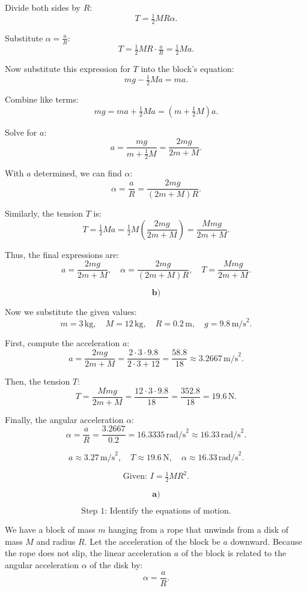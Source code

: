 \documentclass{article}
\begin{document}
Divide both sides by $R$:
\[
T = \tfrac{1}{2} M R \alpha.
\]

Substitute $\alpha = \tfrac{a}{R}$:
\[
T = \tfrac{1}{2} M R \cdot \tfrac{a}{R} = \tfrac{1}{2} M a.
\]

Now substitute this expression for $T$ into the block's equation:
\[
m g - \tfrac{1}{2} M a = m a.
\]

Combine like terms:
\[
m g = m a + \tfrac{1}{2} M a = \left(m + \tfrac{1}{2} M \right) a.
\]

Solve for $a$:
\[
a = \frac{m g}{m + \tfrac{1}{2} M} = \frac{2 m g}{2 m + M}.
\]

With $a$ determined, we can find $\alpha$:
\[
\alpha = \frac{a}{R} = \frac{2 m g}{(2 m + M) R}.
\]

Similarly, the tension $T$ is:
\[
T = \tfrac{1}{2} M a = \tfrac{1}{2} M \left( \frac{2 m g}{2 m + M} \right) = \frac{M m g}{2 m + M}.
\]

Thus, the final expressions are:
\[
a = \frac{2 m g}{2 m + M}, \quad \alpha = \frac{2 m g}{(2 m + M) R}, \quad T = \frac{M m g}{2 m + M}.
\]

\[
\textbf{b)} 
\]

Now we substitute the given values: 
\[
m = 3 \,\text{kg}, \quad M = 12 \,\text{kg}, \quad R = 0.2 \,\text{m}, \quad g = 9.8 \,\text{m/s}^2.
\]

First, compute the acceleration $a$:
\[
a = \frac{2 m g}{2 m + M} = \frac{2 \cdot 3 \cdot 9.8}{2 \cdot 3 + 12} = \frac{58.8}{18} \approx 3.2667 \,\text{m/s}^2.
\]

Then, the tension $T$:
\[
T = \frac{M m g}{2 m + M} = \frac{12 \cdot 3 \cdot 9.8}{18} = \frac{352.8}{18} = 19.6 \,\text{N}.
\]

Finally, the angular acceleration $\alpha$:
\[
\alpha = \frac{a}{R} = \frac{3.2667}{0.2} = 16.3335 \,\text{rad/s}^2 \approx 16.33 \,\text{rad/s}^2.
\]

\[
\boxed{a \approx 3.27 \,\text{m/s}^2, \quad T \approx 19.6 \,\text{N}, \quad \alpha \approx 16.33 \,\text{rad/s}^2.}
\]

\[
\text{Given: } I = \tfrac{1}{2}MR^2.
\]

\[
\textbf{a)} 
\]

\[
\text{Step 1: Identify the equations of motion.}
\]

We have a block of mass \(m\) hanging from a rope that unwinds from a disk of mass \(M\) and radius \(R\). Let the acceleration of the block be \(a\) downward. Because the rope does not slip, the linear acceleration \(a\) of the block is related to the angular acceleration \(\alpha\) of the disk by:
\[
\alpha = \frac{a}{R}.
\]
\end{document}
